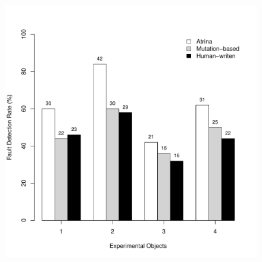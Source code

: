 \begin{figure}[!t]
  \centering
  \includegraphics[width=1\hsize]{r-scripts/barplot-faultDetectionRate}
  \vspace{-0.18in}   
  \vspace{-0.1in} 
  \label{Fig:barplot-faultDetectionRate}

\end{figure}






